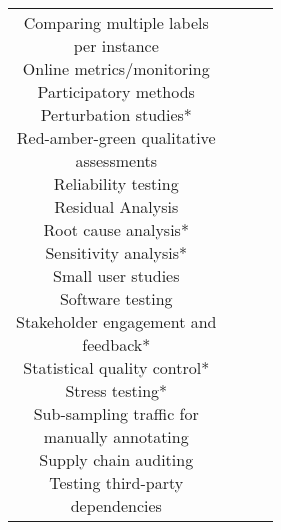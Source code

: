 \documentclass[fleqn]{article}
\begin{document}
\begin{table}[H]
\begin{tabular}{|c|c|c|c|}
{			\textbullet\hspace{3pt} Comparing multiple labels \\\hspace{10pt}per instance\\ 	
			\textbullet\hspace{3pt} Online metrics/monitoring\\ 	
			\textbullet\hspace{3pt} Participatory methods\\ 	
			\textbullet\hspace{3pt} Perturbation studies*\\ 			
			\textbullet\hspace{3pt} Red-amber-green qualitative \\\hspace{10pt}assessments\\ 	
			\textbullet\hspace{3pt} Reliability testing\\ 	
			\textbullet\hspace{3pt} Residual Analysis\\ 	
			\textbullet\hspace{3pt} Root cause analysis*\\ 	
			\textbullet\hspace{3pt} Sensitivity analysis*\\ 	
			\textbullet\hspace{3pt} Small user studies\\ 	
			\textbullet\hspace{3pt} Software testing\\ 	
			\textbullet\hspace{3pt} Stakeholder engagement and \\\hspace{10pt}feedback*\\ 	
			\textbullet\hspace{3pt} Statistical quality control*\\ 	
			\textbullet\hspace{3pt} Stress testing*\\ 	
			\textbullet\hspace{3pt} Sub-sampling traffic for\\\hspace{10pt}manually annotating\\ 	
			\textbullet\hspace{3pt} Supply chain auditing\\ 	
			\textbullet\hspace{3pt} Testing third-party \\\hspace{10pt}dependencies\\ 	
}
\end{tabular}
\end{table}
\end{document}
